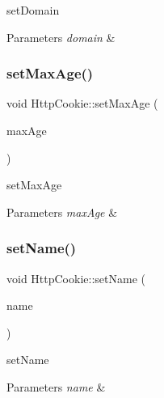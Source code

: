set\+Domain 


\begin{DoxyParams}{Parameters}
{\em domain} & \\
\hline
\end{DoxyParams}
\mbox{\label{class_http_cookie_a4bee3fe68608752f1bea204a3a6b5134}} 
\subsubsection{\texorpdfstring{set\+Max\+Age()}{setMaxAge()}}
{\footnotesize\ttfamily void Http\+Cookie\+::set\+Max\+Age (\begin{DoxyParamCaption}\item[{int}]{max\+Age }\end{DoxyParamCaption})}



set\+Max\+Age 


\begin{DoxyParams}{Parameters}
{\em max\+Age} & \\
\hline
\end{DoxyParams}
\mbox{\label{class_http_cookie_a18dc03fc2cc3901051f7aec516c964b8}} 
\subsubsection{\texorpdfstring{set\+Name()}{setName()}}
{\footnotesize\ttfamily void Http\+Cookie\+::set\+Name (\begin{DoxyParamCaption}\item[{const Q\+Byte\+Array \&}]{name }\end{DoxyParamCaption})}



set\+Name 


\begin{DoxyParams}{Parameters}
{\em name} & \\
\hline
\end{DoxyParams}
\mbox{\label{class_http_cookie_ae302154143022f4bb213afc569df8dd5}} 
